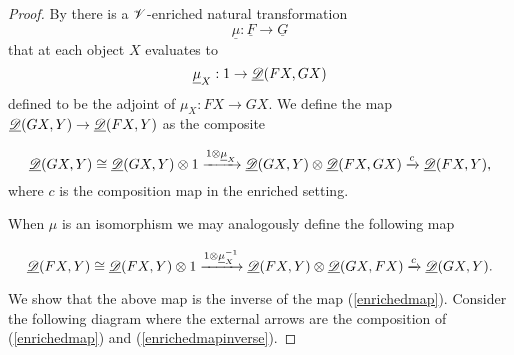 \documentclass[Thesis.tex]{subfiles}
\begin{document}
\begin{proof}
By  there is a $\mathscr{V}$-enriched natural transformation 
\[\underline{\mu}:\underline{F}\to\underline{G}\]
that at each object $X$ evaluates to \[\underline{\mu}_X:1\to\underline{\mathscr{D}}(FX,GX)\] defined to be the adjoint of $\mu_X:FX\to GX$. We define the map $\underline{\mathscr{D}}(GX,Y)\to\underline{\mathscr{D}}(FX,Y)$ as the composite

\begin{equation}\label{enrichedmap}
\underline{\mathscr{D}}(GX,Y)\cong\underline{\mathscr{D}}(GX,Y)\otimes 1\xrightarrow{1\otimes\underline{\mu}_X}\underline{\mathscr{D}}(GX,Y)\otimes\underline{\mathscr{D}}(FX,GX)\xrightarrow{c}\underline{\mathscr{D}}(FX,Y),
\end{equation}
where $c$ is the composition map in the enriched setting. 

When $\mu$ is an isomorphism we may analogously define the following map

\begin{equation}\label{enrichedmapinverse}
\underline{\mathscr{D}}(FX,Y)\cong\underline{\mathscr{D}}(FX,Y)\otimes 1\xrightarrow{1\otimes\underline{\mu}^{-1}_X}\underline{\mathscr{D}}(FX,Y)\otimes\underline{\mathscr{D}}(GX,FX)\xrightarrow{c}\underline{\mathscr{D}}(GX,Y).
\end{equation}

We show that the above map is the inverse of the map (\ref{enrichedmap}). Consider the following diagram where the external arrows are the composition of (\ref{enrichedmap}) and (\ref{enrichedmapinverse}).


\end{proof}
\end{document}

